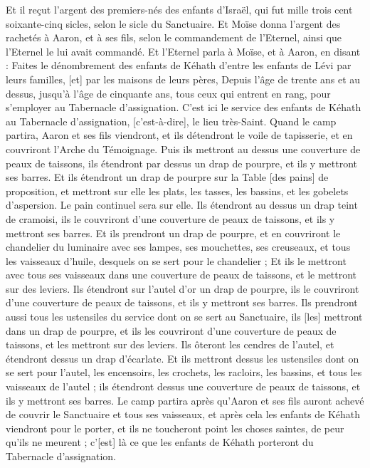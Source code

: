 \begin{multicols}{2}
Et il reçut l'argent des premiers-nés des enfants d'Israël, qui fut mille trois cent soixante-cinq sicles, selon le sicle du Sanctuaire.
Et Moïse donna l'argent des rachetés à Aaron, et à ses fils, selon le commandement de l'Eternel, ainsi que l'Eternel le lui avait commandé.
\VerseOne{}Et l'Eternel parla à Moïse, et à Aaron, en disant :
Faites le dénombrement des enfants de Kéhath d'entre les enfants de Lévi par leurs familles, [et] par les maisons de leurs pères,
Depuis l'âge de trente ans et au dessus, jusqu'à l'âge de cinquante ans, tous ceux qui entrent en rang, pour s'employer au Tabernacle d'assignation.
C'est ici le service des enfants de Kéhath au Tabernacle d'assignation, [c'est-à-dire], le lieu très-Saint.
Quand le camp partira, Aaron et ses fils viendront, et ils détendront le voile de tapisserie, et en couvriront l'Arche du Témoignage.
Puis ils mettront au dessus une couverture de peaux de taissons, ils étendront par dessus un drap de pourpre, et ils y mettront ses barres.
Et ils étendront un drap de pourpre sur la Table [des pains] de proposition, et mettront sur elle les plats, les tasses, les bassins, et les gobelets d'aspersion. Le pain continuel sera sur elle.
Ils étendront au dessus un drap teint de cramoisi, ils le couvriront d'une couverture de peaux de taissons, et ils y mettront ses barres.
Et ils prendront un drap de pourpre, et en couvriront le chandelier du luminaire avec ses lampes, ses mouchettes, ses creuseaux, et tous les vaisseaux d'huile, desquels on se sert pour le chandelier ;
Et ils le mettront avec tous ses vaisseaux dans une couverture de peaux de taissons, et le mettront sur des leviers.
Ils étendront sur l'autel d'or un drap de pourpre, ils le couvriront d'une couverture de peaux de taissons, et ils y mettront ses barres.
Ils prendront aussi tous les ustensiles du service dont on se sert au Sanctuaire, ils [les] mettront dans un drap de pourpre, et ils les couvriront d'une couverture de peaux de taissons, et les mettront sur des leviers.
Ils ôteront les cendres de l'autel, et étendront dessus un drap d'écarlate.
Et ils mettront dessus les ustensiles dont on se sert pour l'autel, les encensoirs, les crochets, les racloirs, les bassins, et tous les vaisseaux de l'autel ; ils étendront dessus une couverture de peaux de taissons, et ils y mettront ses barres.
Le camp partira après qu'Aaron et ses fils auront achevé de couvrir le Sanctuaire et tous ses vaisseaux, et après cela les enfants de Kéhath viendront pour le porter, et ils ne toucheront point les choses saintes, de peur qu'ils ne meurent ; c'[est] là ce que les enfants de Kéhath porteront du Tabernacle d'assignation.

\end{multicols}
